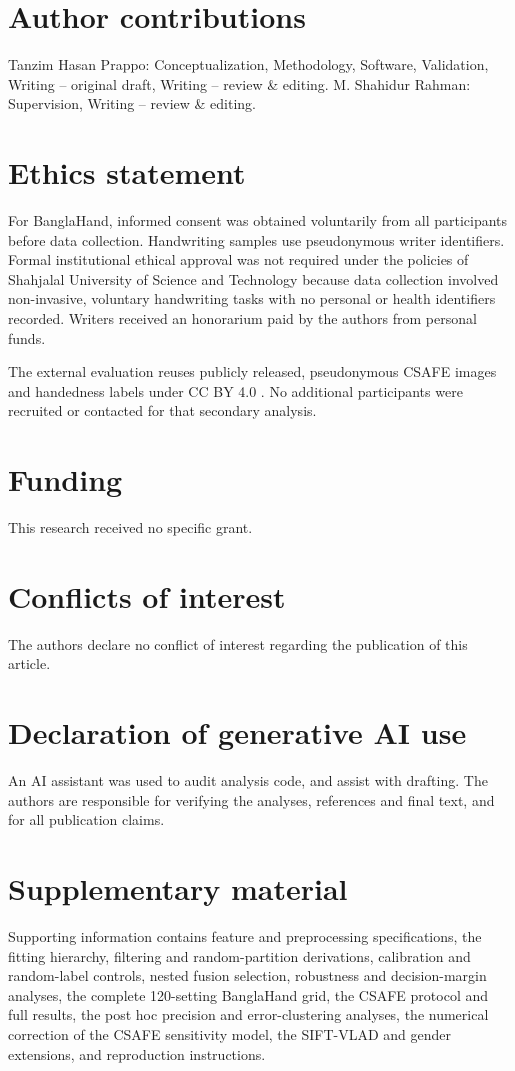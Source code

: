 \section*{Author contributions}
Tanzim Hasan Prappo: Conceptualization, Methodology, Software, Validation, Writing -- original draft, Writing -- review \& editing. M. Shahidur Rahman: Supervision, Writing -- review \& editing.

\section*{Ethics statement}
For BanglaHand, informed consent was obtained voluntarily from all participants before data collection. Handwriting samples use pseudonymous writer identifiers. Formal institutional ethical approval was not required under the policies of Shahjalal University of Science and Technology because data collection involved non-invasive, voluntary handwriting tasks with no personal or health identifiers recorded. Writers received an honorarium paid by the authors from personal funds.

The external evaluation reuses publicly released, pseudonymous CSAFE images and handedness labels under CC BY 4.0 \cite{crawford2020database,crawford2026csafe}. No additional participants were recruited or contacted for that secondary analysis.

\section*{Funding}
This research received no specific grant.

\section*{Conflicts of interest}
The authors declare no conflict of interest regarding the publication of this article.

\section*{Declaration of generative AI use}
An AI assistant was used to audit analysis code, and assist with drafting. The authors are responsible for verifying the analyses, references and final text, and for all publication claims.

\section*{Supplementary material}
Supporting information contains feature and preprocessing specifications, the fitting hierarchy, filtering and random-partition derivations, calibration and random-label controls, nested fusion selection, robustness and decision-margin analyses, the complete 120-setting BanglaHand grid, the CSAFE protocol and full results, the post hoc precision and error-clustering analyses, the numerical correction of the CSAFE sensitivity model, the SIFT-VLAD and gender extensions, and reproduction instructions.
